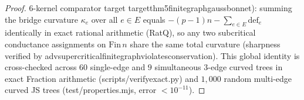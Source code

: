 \documentclass[11pt,a4paper]{article}
\numberwithin{equation}{section}
\theoremstyle{plain}
\theoremstyle{definition}
\theoremstyle{remark}
\newcommand{\code}[1]{{\ttfamily\footnotesize\def\_{\textunderscore\penalty0\hskip0pt}#1}}
\begin{document}
\begin{proof}
6-kernel comparator target \code{target\_\allowbreak thm5\_\allowbreak finite\_\allowbreak graph\_\allowbreak gauss\_\allowbreak bonnet}): summing the bridge curvature $\kappa_e$ over all $e \in E$ equals $-(p-1)n - \sum_{e\in E}\mathrm{def}_e$ identically in exact rational arithmetic (\code{RatQ}), so any two subcritical conductance assignments on $\mathrm{Fin}\,n$ share the same total curvature (sharpness verified by \code{adv\_\allowbreak supercritical\_\allowbreak finite\_\allowbreak graph\_\allowbreak violates\_\allowbreak conservation}). This global identity is cross-checked across $60$ single-edge and $9$ simultaneous $3$-edge curved trees in exact \code{Fraction} arithmetic (\code{scripts/\allowbreak verify\_\allowbreak exact.\allowbreak py}) and $1{,}000$ random multi-edge curved JS trees (\code{test/\allowbreak properties.\allowbreak mjs}, error $< 10^{-11}$).
\end{proof}
\end{document}
